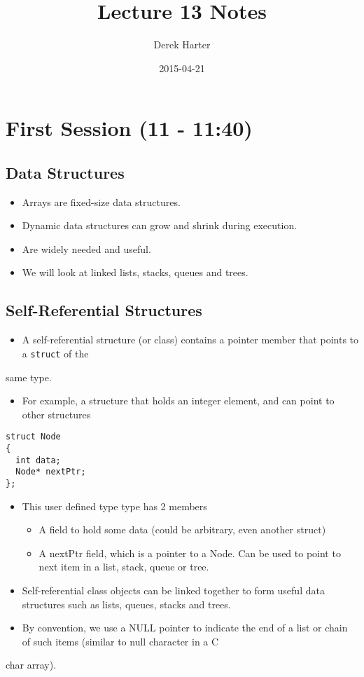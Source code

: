 \documentclass[11pt]{article}
\title{Lecture 13 Notes}
\author{Derek Harter}
\date{2015-04-21}
\begin{document}
\maketitle


\section{First Session (11 - 11:40)}
\label{sec-1}
\subsection{Data Structures}
\label{sec-1-1}

\begin{itemize}
\item Arrays are fixed-size data structures.
\item Dynamic data structures can grow and shrink during execution.
\item Are widely needed and useful.
\item We will look at linked lists, stacks, queues and trees.
\end{itemize}
\subsection{Self-Referential Structures}
\label{sec-1-2}

\begin{itemize}
\item A self-referential structure (or class) contains a pointer member that points to a \verb~struct~ of the
\end{itemize}
same type.
\begin{itemize}
\item For example, a structure that holds an integer element, and can point to other structures
\end{itemize}


\begin{verbatim}
struct Node
{
  int data;
  Node* nextPtr;
};
\end{verbatim}

\begin{itemize}
\item This user defined type type has 2 members
\begin{itemize}
\item A field to hold some data (could be arbitrary, even another struct)
\item A nextPtr field, which is a pointer to a Node.  Can be used to point to next item in a list, stack, queue or tree.
\end{itemize}
\item Self-referential class objects can be linked together to form useful data structures such as lists, queues, stacks and trees.
\item By convention, we use a NULL pointer to indicate the end of a list or chain of such items (similar to null character in a C
\end{itemize}
char array).
\end{document}
